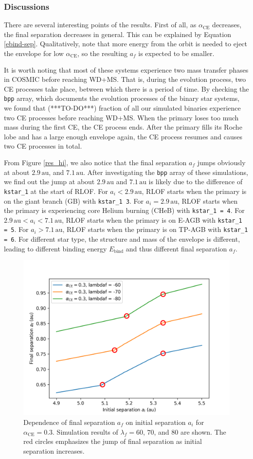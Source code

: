 \documentclass[12pt]{article}
\newcommand{\alphace}{\alpha_{\mathrm{CE}}}
\newcommand{\Ebind}{E_{\mathrm{bind}}}
\newcommand{\au}{\, \mathrm{au}}
\begin{document}
\subsubsection{Discussions}

There are several interesting points of the results. First of all, as $\alphace$ decreases, the final separation decreases in general. This can be explained by Equation \ref{ebind-sep}. Qualitatively, note that more energy from the orbit is needed to eject the envelope for low $\alphace$, so the resulting $a_f$ is expected to be smaller. 

It is worth noting that most of these systems experience two mass transfer phases in COSMIC before reaching WD+MS. That is, during the evolution process, two CE processes take place, between which there is a period of time. By checking the \verb|bpp| array, which documents the evolution processes of the binary star systems, we found that (***TO-DO***) fraction of all our simulated binaries experience two CE processes before reaching WD+MS. When the primary loses too much mass during the first CE, the CE process ends. After the primary fills its Roche lobe and has a large enough envelope again, the CE process resumes and causes two CE processes in total.

From Figure \ref{res_hi}, we also notice that the final separation $a_f$ jumps obviously at about $2.9 \au$, and $7.1 \au$. After investigating the \verb|bpp| array of these simulations, we find out the jump at about $2.9 \au$ and $7.1 \au$ is likely due to the difference of \verb|kstar_1| at the start of RLOF. For $a_i < 2.9 \au$, RLOF starts when the primary is on the giant branch (GB) with \verb|kstar_1 3|. For $a_i = 2.9 \au$, RLOF starts when the primary is experiencing core Helium burning (CHeB) with \verb|kstar_1 = 4|. For $2.9 \au < a_i < 7.1 \au$, RLOF starts when the primary is on E-AGB with \verb|kstar_1 = 5|. For $a_i > 7.1 \au$, RLOF starts when the primary is on TP-AGB with \verb|kstar_1 = 6|. For different star type, the structure and mass of the envelope is different, leading to different binding energy $\Ebind$ and thus different final separation $a_f$.

\begin{figure}
  \centering
  \includegraphics[width = 0.5\linewidth]{fig/jump-zoom.png}
  \caption{Dependence of final separation $a_f$ on initial separation $a_i$ for $\alphace = 0.3$. Simulation results of $\lambda_f = 60$, $70$, and $80$ are shown. The red circles emphasizes the jump of final separation as initial separation increases.}
  \label{jump-zoom}
\end{figure}
\end{document}
